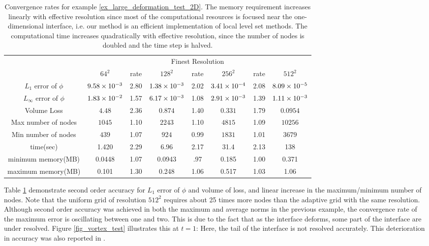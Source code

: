 \documentclass[english]{article}
\begin{document}
\begin{table}
\begin{center}
\begin{tabular}{|c|c|c|c|c|c|c|c|}\hline
\multirow{2}{*}{} & \multicolumn{7}{|c|}{Finest Resolution}   \\\cline{2-8}
                  & $64^2$ & rate & $128^2$ & rate & $256^2$ & rate & $512^2$ \\\hline
$L_1     $ error of $\phi$&$9.58\times 10^{-3}$&2.80&$1.38\times 10^{-3}$&2.02&$3.41\times 10^{-4}$&2.08&$8.09\times 10^{-5}$
\\\hline $L_\infty$ error of
$\phi$&$1.83\times 10^{-2}$&1.57&$6.17\times 10^{-3}$&1.08&$2.91\times 10^{-3}$&1.39&$1.11\times 10^{-3}$ \\\hline Volume Loss
&$4.48       $&2.36&$0.874      $&1.40&$0.331      $&1.79&$0.0954     $ \\\hline Max number of
nodes   &$1045       $&1.10&$2243       $&1.10&$4815       $&1.09&$10256      $ \\\hline Min number
of nodes   &$439        $&1.07&$924        $&0.99&$1831       $&1.01&$3679       $ \\\hline
time(sec) & 1.420 & 2.29 & 6.96 & 2.17 &31.4 & 2.13 & 138 \\
\hline minimum memory(MB) & 0.0448 & 1.07 & 0.0943 & .97 & 0.185 & 1.00 & 0.371 \\
\hline maximum memory(MB) & 0.101 & 1.30 & 0.248 & 1.06 & 0.517 & 1.03 & 1.06 \\ \hline
\end{tabular}
\end{center}
\caption{Convergence rates for example \ref{ex_large_deformation_test_2D}. The memory
requirement increases linearly with effective resolution since most of the computational resources
is focused near the one-dimensional interface, i.e. our method is an efficient implementation of
local level set methods. The computational time increases quadratically with effective resolution,
since the number of nodes is doubled and the time step is halved.} \label{tab_vortex}
\end{table}


Table \ref{tab_vortex} demonstrate second order accuracy for $L_1$ error of
$\phi$ and volume of loss, and linear increase in the maximum/minimum
number of nodes. Note that the uniform grid of resolution $512^2$ requires
about 25 times more nodes than the adaptive grid with the same resolution.
Although second order accuracy was achieved in both the maximum and average
norms in the previous example, the convergence rate of the maximum error is
oscillating between one and two. This is due to the fact that as the
interface deforms, some part of the interface are under resolved. Figure
\ref{fig_vortex_test} illustrates this at $t=1$: Here, the tail of the
interface is not resolved accurately. This deterioration in accuracy was
also reported in \cite{Olsson_Kreiss:2005}.
\end{document}
